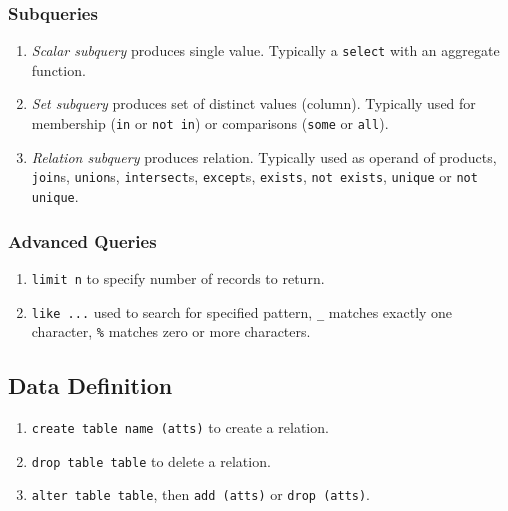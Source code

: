 \documentclass[twocolumn,english]{article}
\begin{document}
\subsubsection{Subqueries}
\begin{enumerate}
\item \emph{Scalar subquery} produces single value. Typically a \texttt{select}
with an aggregate function.
\item \emph{Set subquery} produces set of distinct values (column). Typically
used for membership (\texttt{in} or \texttt{not in}) or comparisons
(\texttt{some} or \texttt{all}).
\item \emph{Relation subquery} produces relation. Typically used as operand
of products, \texttt{join}s, \texttt{union}s, \texttt{intersect}s,
\texttt{except}s, \texttt{exists}, \texttt{not exists}, \texttt{unique}
or \texttt{not unique}.
\end{enumerate}

\subsubsection{Advanced Queries}
\begin{enumerate}
\item \texttt{limit n} to specify number of records to return.
\item \texttt{like ...} used to search for specified pattern, \texttt{\_}
matches exactly one character, \texttt{\%} matches zero or more characters.
\end{enumerate}

\subsection{Data Definition}
\begin{enumerate}
\item \texttt{create table name (atts)} to create a relation.
\item \texttt{drop table table} to delete a relation.
\item \texttt{alter table table}, then \texttt{add (atts)} or \texttt{drop
(atts)}.
\end{enumerate}
\end{document}
